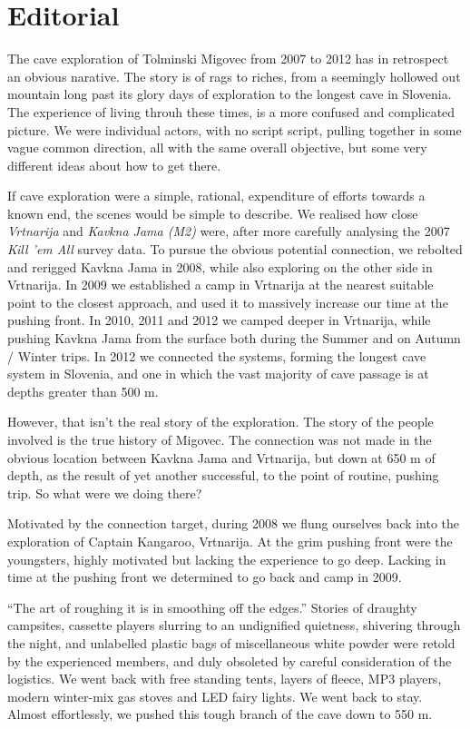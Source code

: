 \chapter*{Editorial}

The cave exploration of Tolminski Migovec from 2007 to 2012 has in
retrospect an obvious narative. The story is of rags to riches, from a
seemingly hollowed out mountain long past its glory days of exploration
to the longest cave in Slovenia. The experience of living throuh these
times, is a more confused and complicated picture. We were individual
actors, with no script script, pulling together in some vague common
direction, all with the same overall objective, but some very different
ideas about how to get there.

If cave exploration were a simple, rational, expenditure of efforts
towards a known end, the scenes would be simple to describe. We realised
how close \emph{Vrtnarija} and \emph{Kavkna Jama (M2)} were, after more
carefully analysing the 2007 \emph{Kill 'em All} survey data. To pursue
the obvious potential connection, we rebolted and rerigged Kavkna Jama
in 2008, while also exploring on the other side in Vrtnarija. In 2009 we
established a camp in Vrtnarija at the nearest suitable point to the
closest approach, and used it to massively increase our time at the
pushing front. In 2010, 2011 and 2012 we camped deeper in Vrtnarija,
while pushing Kavkna Jama from the surface both during the Summer and on
Autumn / Winter trips. In 2012 we connected the systems, forming the
longest cave system in Slovenia, and one in which the vast majority of
cave passage is at depths greater than 500 m.

However, that isn't the real story of the exploration. The story of the
people involved is the true history of Migovec. The connection was not
made in the obvious location between Kavkna Jama and Vrtnarija, but down
at 650 m of depth, as the result of yet another successful, to the point
of routine, pushing trip. So what were we doing there?

Motivated by the connection target, during 2008 we flung ourselves back
into the exploration of Captain Kangaroo, Vrtnarija. At the grim pushing
front were the youngsters, highly motivated but lacking the experience
to go deep. Lacking in time at the pushing front we determined to go
back and camp in 2009.

``The art of roughing it is in smoothing off the edges.'' Stories of
draughty campsites, cassette players slurring to an undignified
quietness, shivering through the night, and unlabelled plastic bags of
miscellaneous white powder were retold by the experienced members, and
duly obsoleted by careful consideration of the logistics. We went back
with free standing tents, layers of fleece, MP3 players, modern
winter-mix gas stoves and LED fairy lights. We went back to stay. Almost
effortlessly, we pushed this tough branch of the cave down to 550 m.

